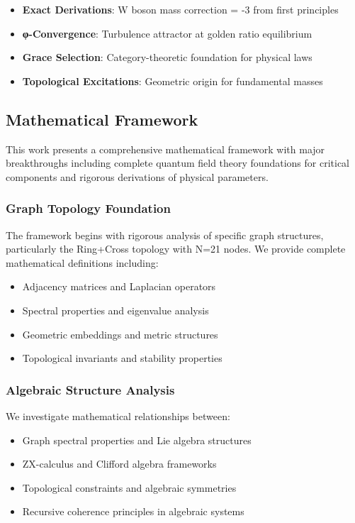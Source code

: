 \documentclass[12pt,a4paper]{article}
\begin{document}
\begin{itemize}
\item \textbf{Exact Derivations}: W boson mass correction = -3 from first principles
\item \textbf{φ-Convergence}: Turbulence attractor at golden ratio equilibrium
\item \textbf{Grace Selection}: Category-theoretic foundation for physical laws
\item \textbf{Topological Excitations}: Geometric origin for fundamental masses
\end{itemize}

\subsection{Mathematical Framework}

This work presents a comprehensive mathematical framework with major breakthroughs including complete quantum field theory foundations for critical components and rigorous derivations of physical parameters.

\subsubsection{Graph Topology Foundation}
The framework begins with rigorous analysis of specific graph structures, particularly the Ring+Cross topology with N=21 nodes. We provide complete mathematical definitions including:
\begin{itemize}
\item Adjacency matrices and Laplacian operators
\item Spectral properties and eigenvalue analysis
\item Geometric embeddings and metric structures
\item Topological invariants and stability properties
\end{itemize}

\subsubsection{Algebraic Structure Analysis}
We investigate mathematical relationships between:
\begin{itemize}
\item Graph spectral properties and Lie algebra structures
\item ZX-calculus and Clifford algebra frameworks
\item Topological constraints and algebraic symmetries
\item Recursive coherence principles in algebraic systems
\end{itemize}
\end{document}
